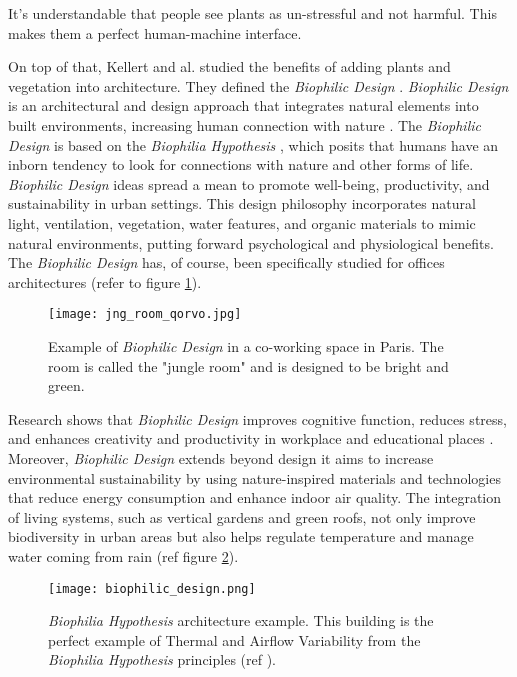 It's understandable that people see plants as un-stressful and not harmful. This makes them a perfect human-machine interface.


On top of that, Kellert and al. studied the benefits of adding plants and vegetation into architecture. They defined the \textit{Biophilic Design} \cite{kellertBiophilicDesignTheory2008}.
\textit{Biophilic Design} is an architectural and design approach that integrates natural elements into built environments, increasing human connection with nature \cite{downtonBiophilicDesignApplications2017}. The \textit{Biophilic Design} is based on the \textit{Biophilia Hypothesis} \cite{kellertBiophiliaHypothesis}, which posits that humans have an inborn tendency to look for connections with nature and other forms of life. \textit{Biophilic Design} ideas spread a mean to promote well-being, productivity, and sustainability in urban settings. This design philosophy incorporates natural light, ventilation, vegetation, water features, and organic materials to mimic natural environments, putting forward psychological and physiological benefits. The \textit{Biophilic Design} has, of course, been specifically studied for offices architectures (refer to figure \ref{fig:jng_room_qorvo}).

\begin{figure}[h!]
    \centering
    \texttt{[image: jng\_room\_qorvo.jpg]}
    \caption{Example of \textit{Biophilic Design} in a co-working space in Paris. The room is called the "jungle room" and is designed to be bright and green.}
    \vspace{0.1cm}
    \label{fig:jng_room_qorvo}
\end{figure}



Research shows that \textit{Biophilic Design} improves cognitive function, reduces stress, and enhances creativity and productivity in workplace and educational places \cite{kellert2015practice}. Moreover, \textit{Biophilic Design} extends beyond design it aims to increase environmental sustainability by using nature-inspired materials and technologies that reduce energy consumption and enhance indoor air quality. The integration of living systems, such as vertical gardens and green roofs, not only improve biodiversity in urban areas but also helps regulate temperature and manage water coming from rain \cite{ryanBiophilicDesign2018a} (ref figure \ref{fig:biophilic_design}).

\begin{figure}[h!]
    \centering
    \texttt{[image: biophilic\_design.png]}
    \caption{\textit{Biophilia Hypothesis} architecture example. This building is the perfect example of Thermal and Airﬂow Variability from the \textit{Biophilia Hypothesis} principles (ref \citet{ryanBiophilicDesign2018a}).}
    \vspace{0.1cm}
    \label{fig:biophilic_design}
\end{figure}


